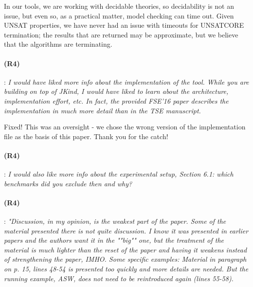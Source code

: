 \documentclass{article}
\begin{document}
In our tools, we are working with decidable theories, so decidability is not an issue, but even so, as a practical matter, model checking can time out.  Given UNSAT properties, we have never had an issue with timeouts for UNSATCORE termination; the results that are returned may be approximate, but we believe that the algorithms are terminating.

\paragraph{(R4)}: \textit{I would have liked more info about the implementation of the tool. While you are building on top of JKind, I would have liked to learn about the architecture, implementation effort, etc. In fact, the provided FSE'16 paper describes the implementation in much more detail than in the TSE manuscript.}
\vspace{0.05in}

Fixed!  This was an oversight - we chose the wrong version of the implementation file as the basis of this paper.  Thank you for the catch!

\paragraph{(R4)}: \textit{I would also like more info about the experimental setup, Section 6.1: which benchmarks did you exclude then and why?}
\vspace{0.05in}


\paragraph{(R4)}: \textit{"Discussion, in my opinion, is the weakest part of the paper. Some of the material presented there is not quite discussion. I know it was presented in earlier papers and the authors want it in the ""big"" one, but the treatment of the material is much lighter than the reset of the paper and having it weakens instead of strengthening the paper, IMHO. Some specific examples: Material in paragraph on p. 15, lines 48-54 is presented too quickly and more details are needed.  But the running example, ASW, does not need to be reintroduced again (lines 55-58).}
\vspace{0.05in}
\end{document}
